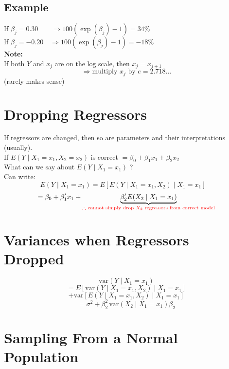 \documentclass[14pt]{extarticle}
\begin{document}
\subsection*{Example}

\noindent
If $\beta_j = 0.30 \quad \quad \Rightarrow 100 \left( \exp(\beta_j) - 1 \right) = 34\%$ \\
If $\beta_j = -0.20 \quad \Rightarrow 100 \left( \exp(\beta_j) - 1 \right) = -18\% $\\
\textbf{Note:}\\
If both $Y$ and $x_j$ are on the log scale, then $x_j = x_{j+1}$
\[
\Rightarrow \text{multiply } x_j \text{ by } e = 2.718\ldots
\]
(rarely makes sense)

\section*{Dropping Regressors}

\noindent
If regressors are changed, then so are parameters and their interpretations (usually).\\
If $E \left( Y \mid X_1 = x_1, X_2 = x_2 \right)$ is correct $= \beta_0 + \beta_1 x_1 + \beta_2 x_2$\\
What can we say about $E(Y \mid X_1 = x_1)$ ?\\
Can write:
\[
E(Y \mid X_1 = x_1) = E \left[ E(Y \mid X_1 = x_1, X_2) \mid X_1 = x_1 \right] \quad
\]
\[
= \beta_0 + \beta_1' x_1 + \underbrace{\beta_2' E(X_2 \mid X_1 = x_1)}_{\textcolor{red}{\therefore \text{ cannot simply drop } X_2 \text{ regressors from correct model}}}
\]

\section*{Variances when Regressors Dropped}

\[
\text{var}(Y \mid X_1 = x_1)
\]
\[
= E \left[ \text{var}(Y \mid X_1 = x_1, X_2) \mid X_1 = x_1 \right]
\]
\[
+ \text{var} \left[ E(Y \mid X_1 = x_1, X_2) \mid X_1 = x_1 \right]
\]
\[
= \sigma^2 + \beta_2^2 \, \text{var}(X_2 \mid X_1 = x_1) \beta_2
\]

\section*{Sampling From a Normal Population}
\end{document}
